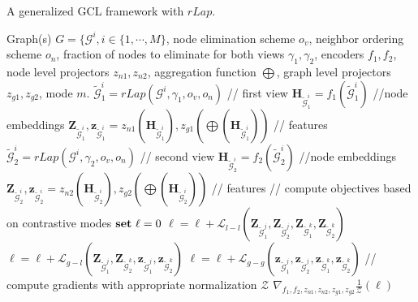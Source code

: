 \documentclass{article}
\def\mH{{\mathbf{H}}}
\def\mZ{{\mathbf{Z}}}
\def\vz{{\mathbf{z}}}
\def\gG{{\mathcal{G}}}
\theoremstyle{plain}
\theoremstyle{definition}
\theoremstyle{remark}
\begin{document}
\begin{algorithm}[tb]
  \caption{A generalized GCL framework with $rLap$.}
  \label{alg:rlap_gcl}
\begin{algorithmic}
   Graph(s)  $G = \{\gG^i, i \in \{1, \cdots, M\}$, node elimination scheme $o_v$, neighbor ordering scheme $o_n$, fraction of nodes to eliminate for both views $\gamma_1, \gamma_2$, encoders $f_1, f_2$, node level projectors $z_{n1}, z_{n2}$, aggregation function $\bigoplus$, graph level projectors $z_{g1}, z_{g2}$,  mode $m$.
  \REPEAT
  \FOR{ $\gG^i$ in $G$}
  \STATE $\widetilde{\gG}^{i}_1 = rLap(\gG^i, \gamma_1, o_v, o_n)$ \hfill // first view
  \STATE $\mH_{\widetilde{\gG}^{i}_1} = f_1(\widetilde{\gG}^{i}_1)$ \hfill //node embeddings
  \STATE $\mZ_{\widetilde{\gG}^{i}_1}, \vz_{\widetilde{\gG}^{i}_1} = z_{n1}(\mH_{\widetilde{\gG}^{i}_1}), z_{g1}(\bigoplus(\mH_{\widetilde{\gG}^{i}_1}))$ \hfill // features
  \STATE $\widetilde{\gG}^{i}_2 = rLap(\gG^i, \gamma_2, o_v, o_n)$ \hfill // second view
  \STATE $\mH_{\widetilde{\gG}^{i}_2} = f_2(\widetilde{\gG}^{i}_2)$ \hfill //node embeddings
  \STATE $\mZ_{\widetilde{\gG}^{i}_2}, \vz_{\widetilde{\gG}^{i}_2} = z_{n2}(\mH_{\widetilde{\gG}^{i}_2}), z_{g2}(\bigoplus(\mH_{\widetilde{\gG}^{i}_2}))$ \hfill // features
  \ENDFOR
  \STATE // compute objectives based on contrastive modes
  \STATE $\text{\textbf{set} } \ell = 0$
   \STATE  $\ell = \ell + \mathcal{L}_{l-l}(\mZ_{\widetilde{\gG}^{j}_1}, \mZ_{\widetilde{\gG}^{j}_2}, \mZ_{\widetilde{\gG}^{k}_1}, \mZ_{\widetilde{\gG}^{k}_2})$ 
   \STATE  $\ell = \ell + \mathcal{L}_{g-l}(\mZ_{\widetilde{\gG}^{j}_1}, \mZ_{\widetilde{\gG}^{k}_2}, \vz_{\widetilde{\gG}^{j}_1}, \vz_{\widetilde{\gG}^{k}_2})$ 
   \STATE  $\ell = \ell + \mathcal{L}_{g-g}(\vz_{\widetilde{\gG}^{j}_1}, \vz_{\widetilde{\gG}^{j}_2}, \vz_{\widetilde{\gG}^{k}_1}, \vz_{\widetilde{\gG}^{k}_2})$ 
   \ENDIF
  \ENDFOR
  \STATE // compute gradients with appropriate normalization $\mathcal{Z}$
  \STATE $\nabla_{f_1, f_2, z_{n1}, z_{n2}, z_{g1}, z_{g2}} \frac{1}{\mathcal{Z}} (\ell)$
\end{algorithmic}
\end{algorithm}
\end{document}

